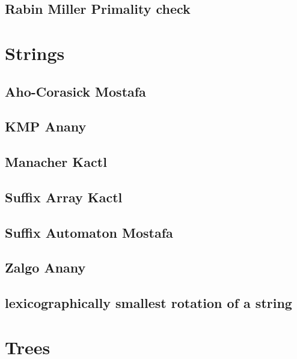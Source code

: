\subsection{Rabin Miller Primality check}
\raggedbottom
\hrulefill

\section{Strings}
\subsection{Aho-Corasick Mostafa}
\raggedbottom
\hrulefill
\subsection{KMP Anany}
\raggedbottom
\hrulefill
\subsection{Manacher Kactl}
\raggedbottom
\hrulefill
\subsection{Suffix Array Kactl}
\raggedbottom
\hrulefill
\subsection{Suffix Automaton Mostafa}
\raggedbottom
\hrulefill
\subsection{Zalgo Anany}
\raggedbottom
\hrulefill
\subsection{lexicographically smallest rotation of a string}
\raggedbottom
\hrulefill

\section{Trees}
